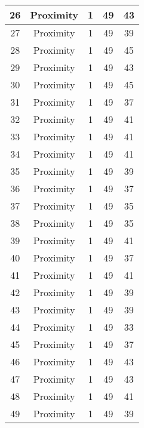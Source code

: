 \documentclass[results.tex]{subfiles}
\begin{document}
\begin{center}
\begin{tabular}{| c || c | c | c | c |}
    \hline
    26 & Proximity & 1 & 49 & 43 \\ 
    \hline
    27 & Proximity & 1 & 49 & 39 \\ 
    \hline
    28 & Proximity & 1 & 49 & 45 \\ 
    \hline
    29 & Proximity & 1 & 49 & 43 \\ 
    \hline
    30 & Proximity & 1 & 49 & 45 \\ 
    \hline
    31 & Proximity & 1 & 49 & 37 \\ 
    \hline
    32 & Proximity & 1 & 49 & 41 \\ 
    \hline
    33 & Proximity & 1 & 49 & 41 \\ 
    \hline
    34 & Proximity & 1 & 49 & 41 \\ 
    \hline
    35 & Proximity & 1 & 49 & 39 \\ 
    \hline
    36 & Proximity & 1 & 49 & 37 \\ 
    \hline
    37 & Proximity & 1 & 49 & 35 \\ 
    \hline
    38 & Proximity & 1 & 49 & 35 \\ 
    \hline
    39 & Proximity & 1 & 49 & 41 \\ 
    \hline
    40 & Proximity & 1 & 49 & 37 \\ 
    \hline
    41 & Proximity & 1 & 49 & 41 \\ 
    \hline
    42 & Proximity & 1 & 49 & 39 \\ 
    \hline
    43 & Proximity & 1 & 49 & 39 \\ 
    \hline
    44 & Proximity & 1 & 49 & 33 \\ 
    \hline
    45 & Proximity & 1 & 49 & 37 \\ 
    \hline
    46 & Proximity & 1 & 49 & 43 \\ 
    \hline
    47 & Proximity & 1 & 49 & 43 \\ 
    \hline
    48 & Proximity & 1 & 49 & 41 \\ 
    \hline
    49 & Proximity & 1 & 49 & 39 \\ 
    \hline   \end{tabular}
\end{center}
\end{document}
